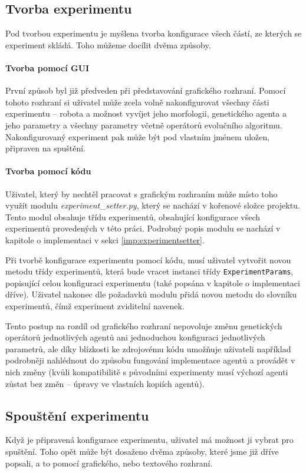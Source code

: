 \subsection{Tvorba experimentu} \label{doc_21_mise_en_place}

Pod tvorbou experimentu je myšlena tvorba konfigurace všech částí, ze kterých
se experiment skládá. Toho můžeme docílit dvěma způsoby. 

\paragraph{Tvorba pomocí GUI}
První způsob byl již předveden při představování grafického rozhraní.
Pomocí tohoto rozhraní si uživatel může zcela volně nakonfigurovat všechny
části experimentu -- robota a možnost vyvíjet jeho morfologii, genetického
agenta a jeho parametry a všechny parametry včetně operátorů evolučního
algoritmu. Nakonfigurovaný experiment pak může být pod vlastním jménem uložen,
připraven na spuštění.

\paragraph{Tvorba pomocí kódu}
Uživatel, který by nechtěl pracovat s grafickým rozhraním může místo toho
využít modulu \emph{experiment\_setter.py}, který se nachází v kořenové složce
projektu. Tento modul obsahuje třídu experimentů, obsahující konfigurace všech
experimentů provedených v této práci. Podrobný popis modulu se nachází v
kapitole o implementaci v sekci \ref{imp:experimentsetter}.

Při tvorbě konfigurace experimentu pomocí kódu, musí uživatel vytvořit novou
metodu třídy experimentů, která bude vracet instanci třídy
\texttt{ExperimentParams}, popisující celou konfiguraci experimentu (také
popsána v kapitole o implementaci dříve). Uživatel nakonec dle požadavků modulu
přidá novou metodu do slovníku experimentů, čímž experiment zviditelní navenek.

Tento postup na rozdíl od grafického rozhraní nepovoluje změnu genetických
operátorů jednotlivých agentů ani jednoduchou konfiguraci jednotlivých
parametrů, ale díky blízkosti ke zdrojovému kódu umožňuje uživateli například
podrobněji nahlédnout do způsobu fungování implementace agentů a provádět v
nich změny (kvůli kompatibilitě s původními experimenty musí výchozí agenti
zůstat bez změn -- úpravy ve vlastních kopiích agentů).

\subsection{Spouštění experimentu} \label{doc_22_cooking}
Když je připravená konfigurace experimentu, uživatel má možnost ji vybrat pro
spuštění. Toho opět může být dosaženo dvěma způsoby, které jsme již dříve
popsali, a to pomocí grafického, nebo textového rozhraní.

